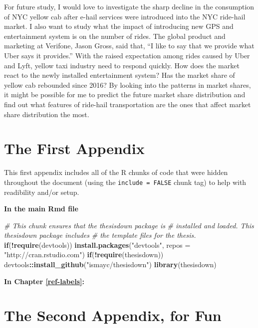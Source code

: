 \documentclass[12pt,twoside]{reedthesis}
\newenvironment{Shaded}{\begin{snugshade}}{\end{snugshade}}
\newcommand{\KeywordTok}[1]{\textcolor[rgb]{0.13,0.29,0.53}{\textbf{#1}}}
\newcommand{\DataTypeTok}[1]{\textcolor[rgb]{0.13,0.29,0.53}{#1}}
\newcommand{\StringTok}[1]{\textcolor[rgb]{0.31,0.60,0.02}{#1}}
\newcommand{\CommentTok}[1]{\textcolor[rgb]{0.56,0.35,0.01}{\textit{#1}}}
\newcommand{\ControlFlowTok}[1]{\textcolor[rgb]{0.13,0.29,0.53}{\textbf{#1}}}
\newcommand{\OperatorTok}[1]{\textcolor[rgb]{0.81,0.36,0.00}{\textbf{#1}}}
\newcommand{\NormalTok}[1]{#1}
\theoremstyle{definition}
\theoremstyle{definition}
\theoremstyle{definition}
\theoremstyle{remark}
\begin{document}
For future study, I would love to investigate the sharp decline in the
consumption of NYC yellow cab after e-hail services were introduced into
the NYC ride-hail market. I also want to study what the impact of
introducing new GPS and entertainment system is on the number of rides.
The global product and marketing at Verifone, Jason Gross, said that,
``I like to say that we provide what Uber says it provides.'' With the
raised expectation among rides caused by Uber and Lyft, yellow taxi
industry need to respond quickly. How does the market react to the newly
installed entertainment system? Has the market share of yellow cab
rebounded since 2016? By looking into the patterns in market shares, it
might be possible for me to predict the future market share distribution
and find out what features of ride-hail transportation are the ones that
affect market share distribution the most.

\appendix

\chapter{The First Appendix}\label{the-first-appendix}

This first appendix includes all of the R chunks of code that were
hidden throughout the document (using the \texttt{include\ =\ FALSE}
chunk tag) to help with readibility and/or setup.

\textbf{In the main Rmd file}
\begin{Shaded}
\begin{Highlighting}[]
\CommentTok{# This chunk ensures that the thesisdown package is}
\CommentTok{# installed and loaded. This thesisdown package includes}
\CommentTok{# the template files for the thesis.}
\ControlFlowTok{if}\NormalTok{(}\OperatorTok{!}\KeywordTok{require}\NormalTok{(devtools))}
  \KeywordTok{install.packages}\NormalTok{(}\StringTok{"devtools"}\NormalTok{, }\DataTypeTok{repos =} \StringTok{"http://cran.rstudio.com"}\NormalTok{)}
\ControlFlowTok{if}\NormalTok{(}\OperatorTok{!}\KeywordTok{require}\NormalTok{(thesisdown))}
\NormalTok{  devtools}\OperatorTok{::}\KeywordTok{install_github}\NormalTok{(}\StringTok{"ismayc/thesisdown"}\NormalTok{)}
\KeywordTok{library}\NormalTok{(thesisdown)}
\end{Highlighting}
\end{Shaded}
\textbf{In Chapter \ref{ref-labels}:}

\chapter{The Second Appendix, for
Fun}\label{the-second-appendix-for-fun}
\end{document}

